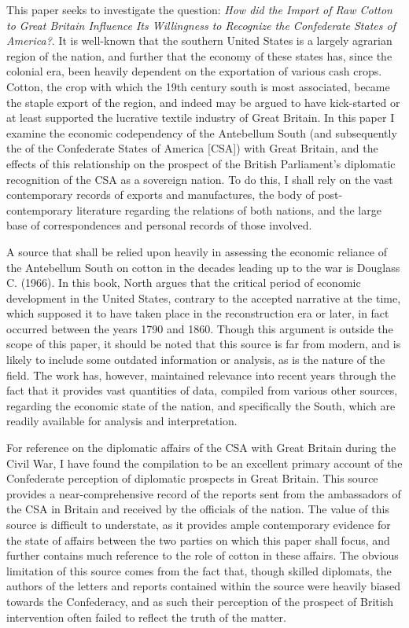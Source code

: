 
This paper seeks to investigate the question: \flq{} \textit{How did the Import of Raw Cotton to Great Britain Influence Its Willingness to Recognize the
Confederate States of America?}\frq{}. It is well-known that the southern United States is a largely agrarian region of the nation, and further that the 
economy of these states has, since the colonial era, been heavily dependent on the exportation of various \flq{}cash crops\frq{}. Cotton, the crop with which 
the 19th century south is most associated, became the staple export of the region, and indeed may be argued to have kick-started or at least supported the 
lucrative textile industry of Great Britain. In this paper I examine the economic codependency of the Antebellum South (and subsequently the of the 
Confederate States of America [CSA]) with Great Britain, and the effects of this relationship on the prospect of the British Parliament's diplomatic 
recognition of the CSA as a sovereign nation. To do this, I shall rely on the vast contemporary records of exports and manufactures, the body of post-
contemporary literature regarding the relations of both nations, and the large base of correspondences and personal records of those involved.

A source that shall be relied upon heavily in assessing the economic reliance of the Antebellum South on cotton in the decades leading up to the war is 
Douglass C.  (1966). In this book, North argues that the critical period of economic development in the United States, 
contrary to the accepted narrative at the time, which supposed it to have taken place in the reconstruction era or later, in fact occurred between the
years 1790 and 1860. Though this argument is outside the scope of this paper, it should be noted that this source is far from modern, and is likely
to include some outdated information or analysis, as is the nature of the field. The work has, however, maintained relevance into recent years
through the fact that it provides vast quantities of data, compiled from various other sources, regarding the economic state of the nation, and specifically
the South, which are readily available for analysis and interpretation.

For reference on the diplomatic affairs of the CSA with Great Britain during the Civil War, I have found the compilation 
to be an excellent primary account of the Confederate perception of diplomatic prospects in Great Britain. This source provides a near-comprehensive 
record of the reports sent from the ambassadors of the CSA in Britain and received by the officials of the nation. The value of this source is difficult
to understate, as it provides ample contemporary evidence for the state of affairs between the two parties on which this paper shall focus, and further
contains much reference to the role of cotton in these affairs. The obvious limitation of this source comes from the fact that, though skilled diplomats,
the authors of the letters and reports contained within the source were heavily biased towards the Confederacy, and as such their perception of the 
prospect of British intervention often failed to reflect the truth of the matter. 